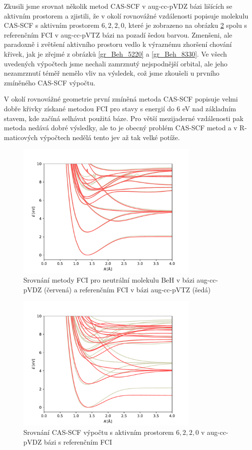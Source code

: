 Zkusili jsme srovnat několik metod CAS-SCF v aug-cc-pVDZ bázi lišících se aktivním 
prostorem a zjistili, že v okolí rovnovážné vzdálenosti popisuje molekulu CAS-SCF s 
aktivním prostorem $6,2,2,0$, které je zobrazeno na obrázku \ref{gr_Beh_6220} spolu s 
referenčním FCI v aug-cc-pVTZ bázi na pozadí šedou barvou. Zmenšeni, ale paradoxně i 
zvětšení aktivního prostoru vedlo k výraznému zhoršení chování křivek, jak je zřejmé z 
obrázků \ref{gr_Beh_5220} a \ref{gr_Beh_8330}. Ve všech uvedených výpočtech jsme 
nechali zamrznutý nejspodnější orbital, ale jeho nezamrznutí téměř nemělo vliv na 
výsledek, 
což jsme zkoušeli u prvního zmíněného CAS-SCF výpočtu.

V okolí rovnovážné geometrie první zmíněná metoda CAS-SCF popisuje velmi dobře křivky 
získané metodou FCI pro stavy s energií do 6 eV nad základním stavem, kde začíná 
selhávat použitá báze. Pro větší mezijaderné vzdálenosti pak metoda nedává dobré 
výsledky, ale to je obecný problém CAS-SCF metod a v R-maticových výpočtech nedělá 
tento jev až tak velké potíže.

\begin{figure}
\centering
\includegraphics[width=0.8\textwidth]{../img/BeH-FCI-DZ.pdf}
\caption{Srovnání metody FCI pro neutrální molekulu BeH v bázi aug-cc-pVDZ (červená) a referenčním FCI v bázi aug-cc-pVTZ (šedá)}
\label{gr_Beh_FCI}
\end{figure}

\begin{figure}
\centering
\includegraphics[width=0.8\textwidth]{../img/BeH-MULTI-DZ-6220.pdf}
\caption{Srovnání CAS-SCF výpočtu s aktivním prostorem $6,2,2,0$ v aug-cc-pVDZ bázi s referenčním FCI}
\label{gr_Beh_6220}
\end{figure}

